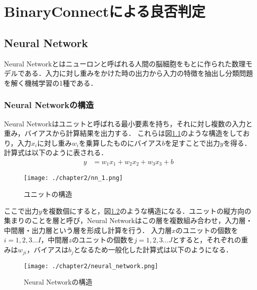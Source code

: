 
\chapter{BinaryConnectによる良否判定}

\section{Neural Network}
Neural Networkとはニューロンと呼ばれる人間の脳細胞をもとに作られた数理モデルである．入力に対し重みをかけた時の出力から入力の特徴を抽出し分類問題を解く機械学習の1種である．


\subsection{Neural Networkの構造}
Neural Networkはユニットと呼ばれる最小要素を持ち，それに対し複数の入力と重み，バイアスから計算結果を出力する．
これらは図\ref{fig_NN1}のような構造をしており，入力$x_i$に対し重み$w_i$を乗算したものにバイアス$b$を足すことで出力$y$を得る．計算式は以下のように表される．
\begin{align}
y &= w_{1}x_{1} + w_{2}x_{2} + w_{3}x_{3} + b
\end{align}
\begin{figure}[htbp]
  \begin{center}
    \texttt{[image: ./chapter2/nn\_1.png]}
    \caption{ユニットの構造}
    \label{fig_NN1}
  \end{center}
\end{figure}

ここで出力$y$を複数個にすると，図\ref{fig_NN}のような構造になる．ユニットの縦方向の集まりのことを層と呼び，Neural Networkはこの層を複数組み合わせ，入力層・中間層・出力層という層を形成し計算を行う．
入力層$x$のユニットの個数を$i=1,2,3\ldots I$，中間層$z$のユニットの個数を$j=1,2,3\ldots J$とすると，それぞれの重みは$w_{ji}$，バイアスは$b_j$となるため一般化した計算式は以下のようになる．
\begin{figure}[htbp]
  \begin{center}
    \texttt{[image: ./chapter2/neural\_network.png]}
    \caption{Neural Networkの構造}
    \label{fig_NN}
  \end{center}
\end{figure}

